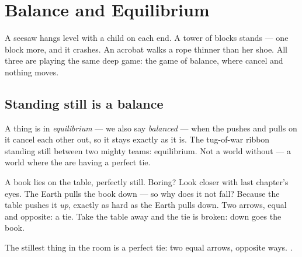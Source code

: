 \chapter{Balance and Equilibrium}\label{ch:g2:balance-equilibrium}

A seesaw hangs level with a child on each end. A tower of blocks
stands --- one block more, and it crashes. An acrobat walks a rope
thinner than her shoe. All three are playing the same deep game:
the game of balance, where  cancel and nothing moves.

\section{Standing still is a balance}

\begin{definition}[Equilibrium]\label{def:g2:balance-equilibrium:equilibrium}
A thing is in \emph{equilibrium} --- we also say
\emph{balanced} --- when the pushes and pulls on it
cancel each other out, so it stays exactly as it is. The tug-of-war
ribbon standing still between two mighty teams: equilibrium. Not a
world without  --- a world where the  are having a
perfect tie.
\end{definition}

\begin{example}\label{ex:g2:balance-equilibrium:book}
A book lies on the table, perfectly still. Boring? Look closer with
last chapter's eyes. The Earth pulls the book down --- so why does
it not fall? Because the table pushes it \emph{up}, exactly as hard
as the Earth pulls down. Two arrows, equal and opposite: a tie. Take
the table away and the tie is broken: down goes the book.
\end{example}

\begin{omfigure}

{\small The stillest thing in the room is a perfect tie: two equal
arrows, opposite ways. .}
\end{omfigure}


